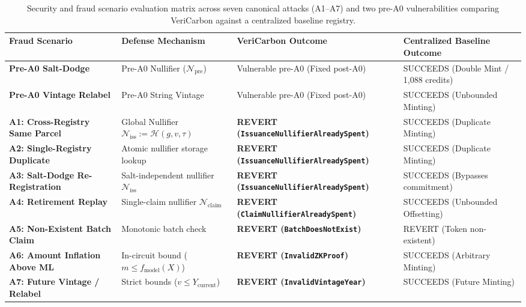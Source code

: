 \begin{table}[t]
\centering
\small
\caption{Security and fraud scenario evaluation matrix across seven canonical attacks (A1–A7) and two pre-A0 vulnerabilities comparing VeriCarbon against a centralized baseline registry.}
\label{tab:fraud_results}
\begin{tabular}{p{3.8cm}p{4.2cm}p{3.8cm}p{3.8cm}}
\hline
\textbf{Fraud Scenario} & \textbf{Defense Mechanism} & \textbf{VeriCarbon Outcome} & \textbf{Centralized Baseline Outcome} \\
\hline
\textbf{Pre-A0 Salt-Dodge} & Pre-A0 Nullifier ($\mathcal{N}_{\text{pre}}$) & Vulnerable pre-A0 (Fixed post-A0) & SUCCEEDS (Double Mint / 1,088 credits) \\
\textbf{Pre-A0 Vintage Relabel} & Pre-A0 String Vintage & Vulnerable pre-A0 (Fixed post-A0) & SUCCEEDS (Unbounded Minting) \\
\hline
\textbf{A1: Cross-Registry Same Parcel} & Global Nullifier $\mathcal{N}_{\text{iss}} := \mathcal{H}(g, v, \tau)$ & \textbf{REVERT (\texttt{IssuanceNullifierAlreadySpent})} & SUCCEEDS (Duplicate Minting) \\
\textbf{A2: Single-Registry Duplicate} & Atomic nullifier storage lookup & \textbf{REVERT (\texttt{IssuanceNullifierAlreadySpent})} & SUCCEEDS (Duplicate Minting) \\
\textbf{A3: Salt-Dodge Re-Registration} & Salt-independent nullifier $\mathcal{N}_{\text{iss}}$ & \textbf{REVERT (\texttt{IssuanceNullifierAlreadySpent})} & SUCCEEDS (Bypasses commitment) \\
\textbf{A4: Retirement Replay} & Single-claim nullifier $\mathcal{N}_{\text{claim}}$ & \textbf{REVERT (\texttt{ClaimNullifierAlreadySpent})} & SUCCEEDS (Unbounded Offsetting) \\
\textbf{A5: Non-Existent Batch Claim} & Monotonic batch check & \textbf{REVERT (\texttt{BatchDoesNotExist})} & REVERT (Token non-existent) \\
\textbf{A6: Amount Inflation Above ML} & In-circuit bound ($m \le f_{\text{model}}(X)$) & \textbf{REVERT (\texttt{InvalidZKProof})} & SUCCEEDS (Arbitrary Minting) \\
\textbf{A7: Future Vintage / Relabel} & Strict bounds ($v \le Y_{\text{current}}$) & \textbf{REVERT (\texttt{InvalidVintageYear})} & SUCCEEDS (Future Minting) \\
\hline
\end{tabular}
\end{table}
